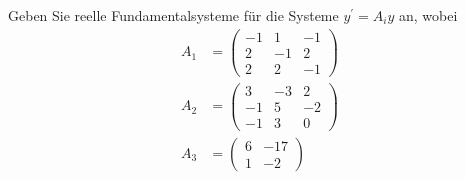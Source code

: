 \begin{exercise}
Geben Sie reelle Fundamentalsysteme für die Systeme $y^{\prime} = A_iy$
an, wobei
\begin{align*}
  A_1 &= \begin{pmatrix}
    -1 & 1 & -1 \\
    2 & -1 & 2 \\
    2 & 2 & -1
  \end{pmatrix} \\
  A_2 &= \begin{pmatrix}
    3 & -3 & 2 \\
    -1 & 5 & -2 \\
    -1 & 3 & 0
  \end{pmatrix} \\
  A_3 &= \begin{pmatrix}
    6 & -17 \\
    1 & -2
  \end{pmatrix}
\end{align*}
\end{exercise}
